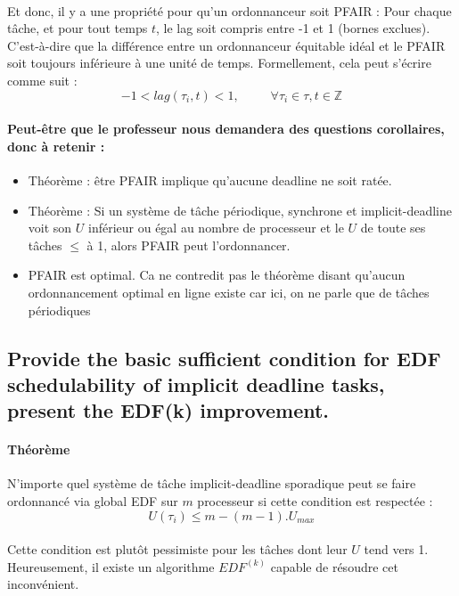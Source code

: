 \paragraph{}
Et donc, il y a une propriété pour qu'un ordonnanceur soit PFAIR : Pour chaque tâche, et pour tout temps $t$, le lag soit compris entre -1 et 1 (bornes exclues). C'est-à-dire que la différence entre un ordonnanceur équitable idéal et le PFAIR soit toujours inférieure à une unité de temps. Formellement, cela peut s'écrire comme suit :
\begin{equation}
-1 < lag(\tau_{i}, t) < 1, \enspace \enspace \enspace \enspace \enspace \forall \tau_{i} \in \tau, t \in \mathbb{Z}
\end{equation}

\paragraph{Peut-être que le professeur nous demandera des questions corollaires, donc à retenir : }
\begin{itemize}
\item Théorème : être PFAIR implique qu'aucune deadline ne soit ratée.
\item Théorème : Si un système de tâche périodique, synchrone et implicit-deadline voit son $U$ inférieur ou égal au nombre de processeur et le $U$ de toute ses tâches $\leq$ à 1, alors PFAIR peut l'ordonnancer.
\item PFAIR est optimal. Ca ne contredit pas le théorème disant qu'aucun ordonnancement optimal en ligne existe car ici, on ne parle que de tâches périodiques
\end{itemize}

\subsection{Provide the basic sufficient condition for EDF schedulability of implicit deadline tasks, present the EDF(k) improvement.}
\paragraph{Théorème} N'importe quel système de tâche implicit-deadline sporadique peut se faire ordonnancé via global EDF sur $m$ processeur si cette condition est respectée : 
\begin{equation}
U(\tau_{i}) \leq m - (m-1).U_{max}
\end{equation}
\paragraph{}
Cette condition est plutôt pessimiste pour les tâches dont leur $U$ tend vers 1. Heureusement, il existe un algorithme $EDF^{(k)}$ capable de résoudre cet inconvénient.


